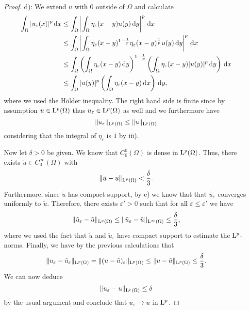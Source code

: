 \begin{enumerate}[i)]
\begin{proof}
    d): We extend $u$ with $0$ outside of $\Omega$ and calculate
    \begin{align*}
      \int_\Omega |u_\varepsilon(x)|^p \d x
      &\leq \int_\Omega \left| \int_\Omega \eta_\varepsilon(x - y) u(y) \d y \right|^p \d x\\
      &\leq \int_\Omega \left| \int_\Omega \eta_\varepsilon(x-y)^{1 - \frac{1}{p}}\eta_\varepsilon(x - y)^{\frac{1}{p}} u(y) \d y \right|^p \d x \\
      &\leq \int_\Omega \left(\int_\Omega \eta_\varepsilon(x - y) \d y\right)^{1 - \frac{1}{p}} \left(\int_\Omega \eta_\varepsilon(x - y)|u(y)|^p \d y \right) \d x \\
      &\leq \int_\Omega |u(y)|^p \left(\int_\Omega \eta_\varepsilon(x - y) \d x\right) \d y,
    \end{align*}
    where we used the Hölder inequality.
    The right hand side is finite since by assumption $u \in \mathrm{L}^p(\Omega)$ thus $u_\varepsilon \in \mathrm{L}^p(\Omega)$ as well and we furthermore have
    $$
    \|u_\varepsilon\|_{\mathrm{L}^p(\Omega)} \leq \|u\|_{\mathrm{L}^p(\Omega)}
    $$
    considering that the integral of $\eta_\varepsilon$ is $1$ by iii).

    Now let $\delta > 0$ be given.
    We know that $C_0^0(\Omega)$ is dense in $\mathrm{L}^p(\Omega)$. 
    Thus, there exists $\tilde u \in C_0^\infty(\Omega)$ with
    $$
    \| \tilde u - u \|_{\mathrm{L}^p(\Omega)} < \frac{\delta}{3}.
    $$
    Furthermore, since $\tilde u$ has compact support, by c) we know that that $\tilde u_\varepsilon$ converges uniformly to $\tilde u$.
  Therefore, there exists $\varepsilon' > 0$ such that for all $\varepsilon \leq \varepsilon'$ we have
    $$
    \|\tilde u_\varepsilon - \tilde u\|_{\mathrm{L}^p(\Omega)} \leq \|\tilde u_\varepsilon - \tilde u\|_{\mathrm{L}^\infty(\Omega)} \leq \frac{\delta}{3},
    $$
    where we used the fact that $\tilde u$ and $\tilde u_\varepsilon$ have compact support to estimate the $\mathrm{L}^p$-norms.
    Finally, we have by the previous calculations that
    $$
    \|u_\varepsilon - \tilde u_\varepsilon\|_{\mathrm{L}^p(\Omega)}
    = \|(u - \tilde u)_\varepsilon\|_{\mathrm{L}^p(\Omega)}
    \leq \|u - \tilde u\|_{\mathrm{L}^p(\Omega)} \leq \frac{\delta}{3}.
    $$
    We can now deduce
    $$
    \|u_\varepsilon - u\|_{\mathrm{L}^p(\Omega)} \leq \delta
    $$
    by the usual argument and conclude that $u_\varepsilon \to u$ in $\mathrm{L}^p$.


\end{proof}
\end{enumerate}

